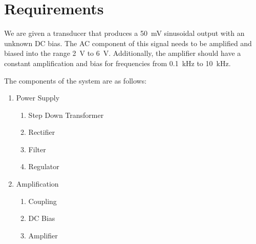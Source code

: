 \documentclass[journal]{IEEEtran}
\begin{document}




\maketitle


\begin{abstract}
Amplification of a \SI{50}{\milli\volt} sinusoidal wave from a transducer can be accomplished using an NMOS transistor by establishing appropriate DC operating points. We wish to produce a signal between \numrange{2}{6}\si{\volt}. To accomplish this a regulated \SI{18}{\volt} power supply was created using a zener diode. The result of this design was a single stage amplifier with an effective gain of approximately \SI[per-mode=symbol]{-37}{\volt\per\volt} and a bandwidth of \SI{9900}{\hertz}. The final output signal stretched from \numrange{2.1}{5.8}\si{\volt}
\end{abstract}


\tableofcontents

\section{Requirements}
We are given a transducer that produces a \SI{50}{\milli\volt} sinusoidal output with an unknown DC bias. The AC component of this signal needs to be amplified and biased into the range \SI{2}{\volt} to \SI{6}{\volt}. Additionally, the amplifier should have a constant amplification and bias for frequencies from \SI{0.1}{\kilo\hertz} to \SI{10}{\kilo\hertz}.

The components of the system are as follows:
\begin{enumerate}
    \item Power Supply
    \begin{enumerate}
        \item Step Down Transformer
        \item Rectifier
        \item Filter
        \item Regulator
    \end{enumerate}
    \item Amplification
    \begin{enumerate}
        \item Coupling
        \item DC Bias
        \item Amplifier
    \end{enumerate}
\end{enumerate}
\end{document}
